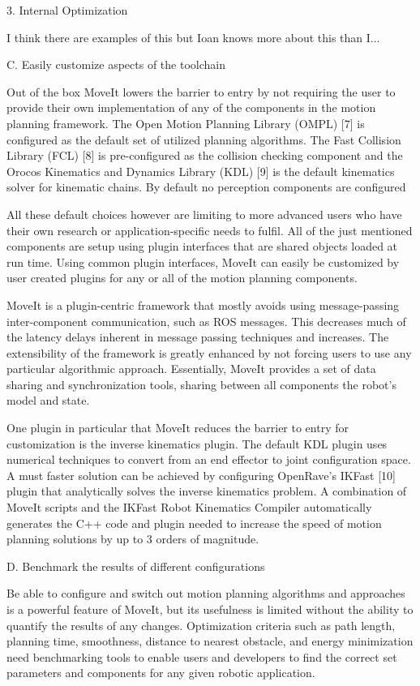\documentclass[10pt,journal,compsoc]{joser1}
\begin{document}
{3. Internal Optimization

I think there are examples of this but Ioan knows more about this than I...

C. Easily customize aspects of the toolchain

Out of the box MoveIt lowers the barrier to entry by not requiring the user to provide their own implementation of any of the components in the motion planning framework. The Open Motion Planning Library (OMPL) [7] is configured as the default set of utilized planning algorithms. The Fast Collision Library (FCL) [8] is pre-configured as the collision checking component and the Orocos Kinematics and Dynamics Library (KDL) [9] is the default kinematics solver for kinematic chains. By default no perception components are configured

All these default choices however are limiting to more advanced users who have their own research or application-specific needs to fulfil. All of the just mentioned components are setup using plugin interfaces that are shared objects loaded at run time. Using common plugin interfaces, MoveIt can easily be customized by user created plugins for any or all of the motion planning components.

MoveIt is a plugin-centric framework that mostly avoids using message-passing inter-component communication, such as ROS messages. This decreases much of the latency delays inherent in message passing techniques and increases. The extensibility of the framework is greatly enhanced by not forcing users to use any particular algorithmic approach. Essentially, MoveIt provides a set of data sharing and synchronization tools, sharing between all components the robot's model and state.

One plugin in particular that MoveIt reduces the barrier to entry for customization is the inverse kinematics plugin. The default KDL plugin uses numerical techniques to convert from an end effector to joint configuration space. A must faster solution can be achieved by configuring OpenRave's IKFast [10] plugin that analytically solves the inverse kinematics problem. A combination of MoveIt scripts and the IKFast Robot Kinematics Compiler automatically generates the C++ code and plugin needed to increase the speed of motion planning solutions by up to 3 orders of magnitude.

D. Benchmark the results of different configurations

Be able to configure and switch out motion planning algorithms and approaches is a powerful feature of MoveIt, but its usefulness is limited without the ability to quantify the results of any changes. Optimization criteria such as path length, planning time, smoothness, distance to nearest obstacle, and energy minimization need benchmarking tools to enable users and developers to find the correct set parameters and components for any given robotic application.

}
\end{document}
